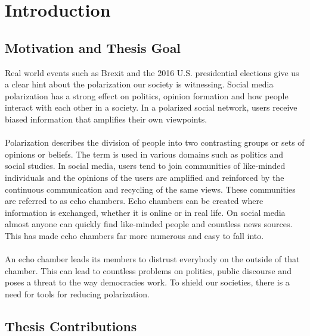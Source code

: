 \chapter{Introduction}
\label{ch:Introduction}


\section{Motivation and Thesis Goal}
\label{sec:motivation}

Real world events such as Brexit and the 2016 U.S. presidential elections give us a clear hint about the polarization our society is witnessing. Social media polarization has a strong effect on politics, opinion formation and how people interact with each other in a society. In a polarized social network, users receive biased information that amplifies their own viewpoints. 
\\
\\
Polarization describes the division of people into two contrasting groups or sets of opinions or beliefs. The term is used in various domains such as politics and social studies.
In social media, users tend to join communities of like-minded individuals and the opinions of the users are amplified and reinforced by the continuous  communication and recycling of the same views. These communities are referred to as echo chambers.
Echo chambers can be created where information is exchanged, whether it is online or in real life. 
On social media almost anyone can quickly find like-minded people and countless news sources. 
This has made echo chambers far more numerous and easy to fall into.
\\
\\
An echo chamber leads its members to distrust everybody on the outside of that chamber. This can lead to countless problems on politics, public discourse and poses a threat to the way democracies work. To shield our societies, there is a need for tools for reducing polarization.


\section{Thesis Contributions}
\label{sec:outline}

